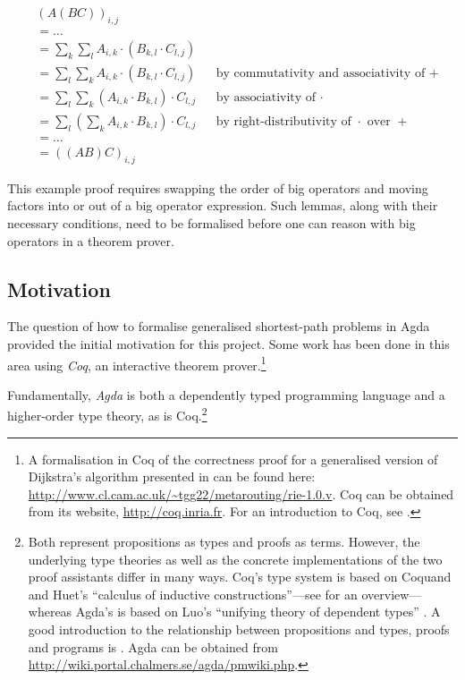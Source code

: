 \documentclass[a4paper]{scrartcl}
\begin{document}
\begin{align*}
&\left(A \left(B C\right)\right)_{i,j} \\
&= \dots \\
&= \sum_k \sum_l  A_{i,k} \cdot \left( B_{k,l} \cdot C_{l,j} \right) \\
&= \sum_l \sum_k  A_{i,k} \cdot \left( B_{k,l} \cdot C_{l,j} \right)
  && \text{by commutativity and associativity of \(+\)} \\
&= \sum_l \sum_k \left( A_{i,k} \cdot B_{k,l} \right) \cdot C_{l,j}
  && \text{by associativity of \(\cdot\)} \\
&= \sum_l \left( \sum_k A_{i,k} \cdot B_{k,l} \right) \cdot C_{l,j}
  && \text{by right-distributivity of \(\cdot\) over \(+\)} \\
&= \dots \\
&= \left( \left( A  B \right) C\right)_{i,j}
\end{align*}

This example proof requires swapping the order of big operators and moving factors into or out of a big operator expression. Such lemmas, along with their necessary conditions, need to be formalised before one can reason with big operators in a theorem prover.

\subsection{Motivation}

The question of how to formalise generalised shortest-path problems in Agda provided the initial motivation for this project.
Some work has been done in this area using \emph{Coq}, an interactive theorem prover.\footnote{A formalisation in Coq of the correctness proof for a generalised version of Dijkstra's algorithm presented in \autocite{sobrinho_routing_2010} can be found here: \url{http://www.cl.cam.ac.uk/~tgg22/metarouting/rie-1.0.v}. Coq can be obtained from its website, \url{http://coq.inria.fr}. For an introduction to Coq, see \autocite{bertot_interactive_2004}.}

Fundamentally, \emph{Agda} is both a dependently typed programming language and a higher-order type theory, as is Coq.\footnote{Both represent propositions as types and proofs as terms. However, the underlying type theories as well as the concrete implementations of the two proof assistants differ in many ways. Coq's type system is based on Coquand and Huet's \enquote{calculus of inductive constructions}---see \textcite{bertot_interactive_2004} for an overview---whereas Agda's is based on Luo's \enquote{unifying theory of dependent types} \autocite{luo_computation_1994}. A good introduction to the relationship between propositions and types, proofs and programs is \textcite{sorensen_lectures_2006}. Agda can be obtained from \url{http://wiki.portal.chalmers.se/agda/pmwiki.php}.}
\end{document}
